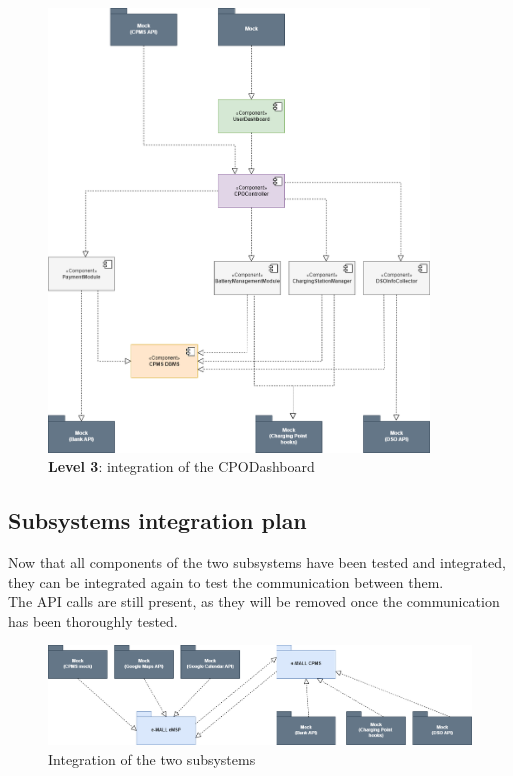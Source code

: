 \documentclass[12pt]{report}
\begin{document}
\bigskip
\begin{figure}[ht]
    \centering
    \includegraphics[width=0.9\textwidth]{assets/level3_CPMS_integration.png}
    \caption{\textbf{Level 3}: integration of the CPODashboard}
    \label{fig:my_label42366434343436331333}
\end{figure}
\clearpage

\subsection{Subsystems integration plan}
Now that all components of the two subsystems have been tested and integrated, they can be integrated again to test the communication between them.\\
The API calls are still present, as they will be removed once the communication has been thoroughly tested.

\bigskip
\begin{figure}[ht]
    \centering
    \includegraphics[width=1.1\textwidth]{assets/high_level_integration.png}
    \caption{Integration of the two subsystems}
    \label{fig:my_label4236643411143436331333}
\end{figure}
\clearpage
\end{document}

